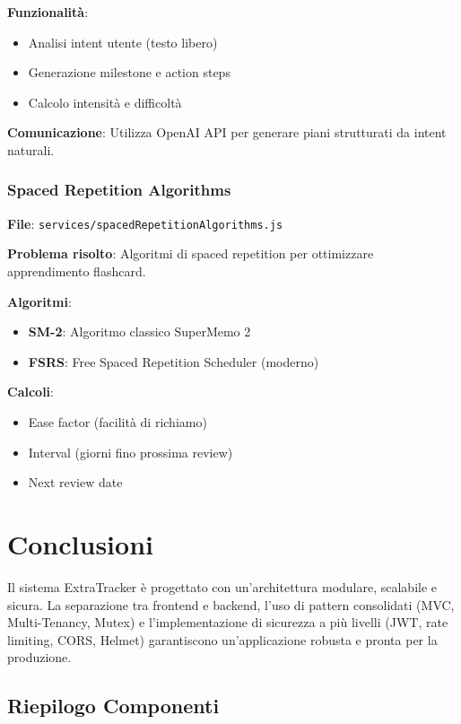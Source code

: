 \documentclass[11pt,a4paper]{article}
\begin{document}
\textbf{Funzionalità}:
\begin{itemize}
    \item Analisi intent utente (testo libero)
    \item Generazione milestone e action steps
    \item Calcolo intensità e difficoltà
\end{itemize}

\textbf{Comunicazione}: Utilizza OpenAI API per generare piani strutturati da intent naturali.

\subsubsection{Spaced Repetition Algorithms}

\textbf{File}: \texttt{services/spacedRepetitionAlgorithms.js}

\textbf{Problema risolto}: Algoritmi di spaced repetition per ottimizzare apprendimento flashcard.

\textbf{Algoritmi}:
\begin{itemize}
    \item \textbf{SM-2}: Algoritmo classico SuperMemo 2
    \item \textbf{FSRS}: Free Spaced Repetition Scheduler (moderno)
\end{itemize}

\textbf{Calcoli}:
\begin{itemize}
    \item Ease factor (facilità di richiamo)
    \item Interval (giorni fino prossima review)
    \item Next review date
\end{itemize}

\section{Conclusioni}

Il sistema ExtraTracker è progettato con un'architettura modulare, scalabile e sicura. La separazione tra frontend e backend, l'uso di pattern consolidati (MVC, Multi-Tenancy, Mutex) e l'implementazione di sicurezza a più livelli (JWT, rate limiting, CORS, Helmet) garantiscono un'applicazione robusta e pronta per la produzione.

\subsection{Riepilogo Componenti}
\end{document}
